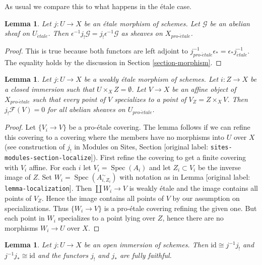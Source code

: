 \documentclass[10pt,a4paper]{article}
\theoremstyle{plain}
\newtheorem{lemma}[subsection]{Lemma}
\theoremstyle{definition}
\theoremstyle{remark}
\numberwithin{equation}{subsection}
\def\Spec{\mathop{\mathrm{Spec}}}
\def\proetale{{pro\text{-}\acute{e}tale}}
\def\etale{{\acute{e}tale}}
\begin{document}
\noindent
As usual we compare this to what happens in the \'etale case.

\begin{lemma}
\label{lemma-jshriek-comparison}
Let $j : U \to X$ be an \'etale morphism of schemes.
Let $\mathcal{G}$ be an abelian sheaf on $U_\etale$.
Then $\epsilon^{-1} j_!\mathcal{G} = j_!\epsilon^{-1}\mathcal{G}$
as sheaves on $X_\proetale$.
\end{lemma}

\begin{proof}
This is true because both functors are left adjoint to
$j_\proetale^{-1} \epsilon_* = \epsilon_* j_\etale^{-1}$.
The equality holds by the discussion in Section \ref{section-morphism}.
\end{proof}

\begin{lemma}
\label{lemma-jshriek-zero}
Let $j : U \to X$ be a weakly \'etale morphism of schemes.
Let $i : Z \to X$ be a closed immersion such that $U \times_X Z = \emptyset$.
Let $V \to X$ be an affine object of $X_\proetale$ such that every point
of $V$ specializes to a point of $V_Z = Z \times_X V$.
Then $j_!\mathcal{F}(V) = 0$ for all abelian sheaves on $U_\proetale$.
\end{lemma}

\begin{proof}
Let $\{V_i \to V\}$ be a pro-\'etale covering. The lemma follows if we
can refine this covering to a covering where the members have no
morphisms into $U$ over $X$ (see construction of $j_!$ in
Modules on Sites, Section [original label: \nolinkurl{sites-modules-section-localize}]).
First refine the covering to get a finite covering with $V_i$ affine.
For each $i$ let $V_i = \Spec(A_i)$ and let $Z_i \subset V_i$ be the
inverse image of $Z$.
Set $W_i = \Spec(A_{i, Z_i}^\sim)$ with notation as in
Lemma [original label: \nolinkurl{lemma-localization}].
Then $\coprod W_i \to V$ is weakly \'etale and the image contains all
points of $V_Z$. Hence the image contains all points of $V$ by
our assumption on specializations. Thus $\{W_i \to V\}$ is a
pro-\'etale covering refining the given one. But each point in $W_i$
specializes to a point lying over $Z$, hence there are no morphisms
$W_i \to U$ over $X$.
\end{proof}

\begin{lemma}
\label{lemma-open-immersion}
Let $j : U \to X$ be an open immersion of schemes.
Then $\text{id} \cong j^{-1}j_!$ and $j^{-1}j_* \cong \text{id}$
and the functors $j_!$ and $j_*$ are fully faithful.
\end{lemma}
\end{document}
